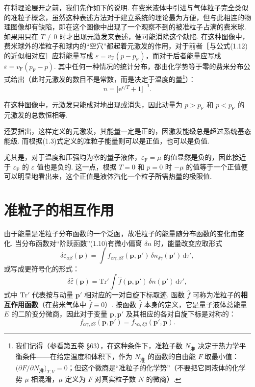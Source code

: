 在将理论展开之前，我们先作如下的说明. 在费米液体中引进与气体粒子完全类似的准粒子概念，虽然这种表述方法对于建立系统的理论最为方便，但与此相连的物理图像却有缺陷，即在这个图像中出现了一个观察不到的被准粒子占满的费米球. 如果用只在 $T\neq0$ 时才出现元激发来表述，便可能消除这个缺陷. 在这种图像中，费米球外的准粒子和球内的“空穴”都起着元激发的作用，对于前者［与公式(1.12)的近似相对应］应将能量写成 $\varepsilon=v_{\mathrm F}(p-p_{\mathrm F})$，而对于后者能量应写成 $\varepsilon=v_{\mathrm F}(p_{\mathrm F}-p)$. 其中任何一种情况的统计分布，都由化学势等于零的费米分布公式给出（此时元激发的数目不是常数，而是决定于温度的量\footnote{我们记得（参看第五卷 §63），在这种条件下，准粒子数 $N_{\text{准}}$ 决定于热力学平衡条件——在给定温度和体积下，作为 $N_{\text{准}}$ 的函数的自由能 $F$ 取最小值：$\bigl(\partial F/\partial N_{\text{准}}\bigr)_{T,V}=0$；但这个微商是“准粒子的化学势”（不要把它同液体的化学势 $\mu$ 相混淆，$\mu$ 定义为 $F$ 对真实粒子数 $N$ 的微商）.}）：
\begin{equation}
n=\bigl[\mathrm{e}^{\varepsilon/T}+1\bigr]^{-1}.
\end{equation}

在这种图像中，元激发只能成对地出现或消失，因此动量为 $p>p_{\mathrm F}$ 和 $p<p_{\mathrm F}$ 的元激发的总数恒相等.

还要指出，这样定义的元激发，其能量一定是正的，因激发能级总是超过系统基态能级. 而根据(1.3)式定义的准粒子能量则可以是正值，也可以是负值.

尤其是，对于温度和压强均为零的量子液体，$\varepsilon_{\mathrm F}=\mu$ 的值显然是负的，因此接近于 $\varepsilon_{\mathrm F}$ 的 $\varepsilon$ 值也是负的. 这一点，根据 $T=0$ 和 $p=0$ 时 $-\mu$ 的值等于一个正值便可以明显地看出来，这个正值是液体汽化一个粒子所需热量的极限值.

\section{准粒子的相互作用}

由于能量是准粒子分布函数的一个泛函，故准粒子的能量随分布函数的变化而变化. 当分布函数对“阶跃函数”(1.10)有微小偏离 $\delta n$ 时，能量改变应取形式
\begin{equation}
\delta\varepsilon_{\alpha\beta}(\bm p)=\int f_{\alpha\gamma,\beta\delta}(\bm p,\bm p')\,\delta n_{\delta\gamma}(\bm p')\,\mathrm{d}\tau',
\end{equation}
或写成更符号化的形式：
\begin{equation*}
\delta\hat\varepsilon(\bm p)=\mathrm{Tr}'\int\hat f(\bm p,\bm p')\,\delta n(\bm p')\,\mathrm{d}\tau',
\end{equation*}
式中 $\mathrm{Tr}'$ 代表按与动量 $\bm p'$ 相对应的一对自旋下标取迹. 函数 $\hat f$ 可称为准粒子的\textbf{相互作用函数}（在费米气体中 $\hat f\equiv0$）. 按函数 $\hat f$ 本身的定义，它是量子液体总能量 $E$ 的二阶变分微商，因此对于变量 $\bm p,\bm p'$ 及其相应的各对自旋下标是对称的：
\begin{equation}
f_{\alpha\gamma,\beta\delta}(\bm p,\bm p')=f_{\gamma\alpha,\delta\beta}(\bm p',\bm p).
\end{equation}

